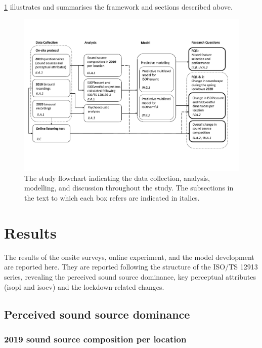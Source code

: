    \cref{fig:lockdown-study-framework} illustrates and summarises the framework and sections described above.

   \begin{figure}
     \centering
     \includegraphics[width=\textwidth]{Figures/Lockdown-Fig1.pdf}
     \caption{The study flowchart indicating the data collection, analysis, modelling, and discussion throughout the study. The subsections in the text to which each box refers are indicated in italics. \label{fig:lockdown-study-framework}}
   \end{figure}

\section{Results}

 The results of the onsite surveys, online experiment, and the model development are reported here. They are reported following the structure of the ISO/TS 12913 series, revealing the perceived sound source dominance, key perceptual attributes (\gls{isopl} and \gls{isoev}) and the lockdown-related changes.

 \subsection{Perceived sound source dominance}

   \subsubsection{2019 sound source composition per location}

